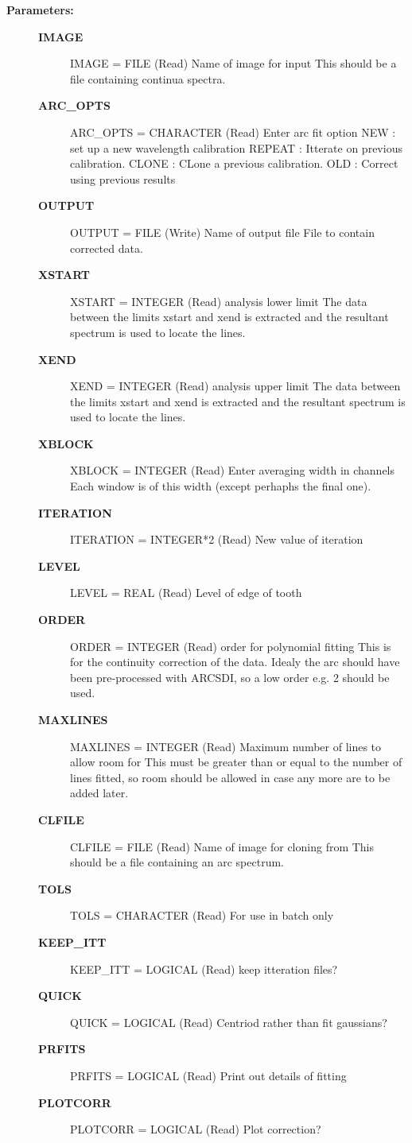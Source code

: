 \begin{description}
\item [\textbf{Parameters:}]
\begin{description}
\item [\textbf{IMAGE}]
    IMAGE = FILE (Read)
        Name of image for input
          This should be a file containing continua spectra.
\item [\textbf{ARC\_OPTS}]
    ARC\_OPTS = CHARACTER (Read)
        Enter arc fit option
          NEW    : set up a new wavelength calibration
          REPEAT : Itterate on previous calibration.
          CLONE  : CLone a previous calibration.
          OLD    : Correct using previous results
\item [\textbf{OUTPUT}]
    OUTPUT = FILE (Write)
        Name of output file
           File to contain corrected data.
\item [\textbf{XSTART}]
    XSTART = INTEGER (Read)
        analysis lower limit
            The data between the limits xstart and xend is extracted
            and the resultant spectrum is used to locate the lines.
\item [\textbf{XEND}]
    XEND = INTEGER (Read)
        analysis upper limit
            The data between the limits xstart and xend is extracted
            and the resultant spectrum is used to locate the lines.
\item [\textbf{XBLOCK}]
    XBLOCK = INTEGER (Read)
        Enter averaging width in channels
            Each window is of this width (except perhaphs the final one).
\item [\textbf{ITERATION}]
    ITERATION = INTEGER*2 (Read)
        New value of iteration
\item [\textbf{LEVEL}]
    LEVEL = REAL (Read)
        Level of edge of tooth
\item [\textbf{ORDER}]
    ORDER = INTEGER (Read)
        order for polynomial fitting
          This is for the continuity correction of the data. Idealy the
          arc should have been pre-processed with ARCSDI, so a low
          order e.g. 2 should be used.
\item [\textbf{MAXLINES}]
    MAXLINES = INTEGER (Read)
        Maximum number of lines to allow room for
          This must be greater than or equal to the number of lines
          fitted, so room should be allowed in case any more are
          to be added later.
\item [\textbf{CLFILE}]
    CLFILE = FILE (Read)
        Name of image for cloning from
          This should be a file containing an arc spectrum.
\item [\textbf{TOLS}]
    TOLS = CHARACTER (Read)
        For use in batch only
\item [\textbf{KEEP\_ITT}]
    KEEP\_ITT = LOGICAL (Read)
        keep itteration files?
\item [\textbf{QUICK}]
    QUICK = LOGICAL (Read)
        Centriod rather than fit gaussians?
\item [\textbf{PRFITS}]
    PRFITS = LOGICAL (Read)
        Print out details of fitting
\item [\textbf{PLOTCORR}]
    PLOTCORR = LOGICAL (Read)
        Plot correction?
\end{description}


\end{description}
